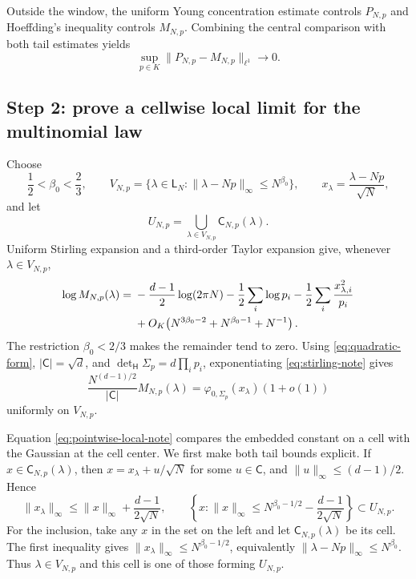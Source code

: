 \documentclass[11pt]{article}
\newcommand{\htile}{\mathsf H}
\begin{document}
Outside the window, the uniform Young concentration estimate controls
$P_{N,p}$ and Hoeffding's inequality controls $M_{N,p}$.  Combining the
central comparison with both tail estimates yields
\begin{equation}\label{eq:young-mult-l1-note}
  \sup_{p\in K}\|P_{N,p}-M_{N,p}\|_{\ell^1}\longrightarrow0.
\end{equation}

\subsection*{Step 2: prove a cellwise local limit for the multinomial law}

Choose
\[
  \frac12<\beta_0<\frac23,
  \qquad
  V_{N,p}=\{\lambda\in\mathsf L_N:
  \|\lambda-Np\|_\infty\le N^{\beta_0}\},
  \qquad
  x_\lambda=\frac{\lambda-Np}{\sqrt N},
\]
and let
\[
  U_{N,p}=\bigcup_{\lambda\in V_{N,p}}
  \mathsf C_{N,p}(\lambda).
\]
Uniform Stirling expansion and a third-order Taylor expansion give, whenever
$\lambda\in V_{N,p}$,
\begin{align}
  \log M_{N,p}(\lambda)
  ={}&-\frac{d-1}{2}\log(2\pi N)
      -\frac12\sum_i\log p_i
      -\frac12\sum_i\frac{x_{\lambda,i}^2}{p_i}\notag\\
     &+O_K\!\left(N^{3\beta_0-2}
                  +N^{\beta_0-1}+N^{-1}\right).
  \label{eq:stirling-note}
\end{align}
The restriction $\beta_0<2/3$ makes the remainder tend to zero.  Using
\eqref{eq:quadratic-form}, $|\mathsf C|=\sqrt d$, and
$\det_{\htile}\Sigma_p=d\prod_i p_i$, exponentiating
\eqref{eq:stirling-note} gives
\begin{equation}\label{eq:pointwise-local-note}
  \frac{N^{(d-1)/2}}{|\mathsf C|}M_{N,p}(\lambda)
  =\varphi_{0,\Sigma_p}(x_\lambda)(1+o(1))
\end{equation}
uniformly on $V_{N,p}$.

Equation \eqref{eq:pointwise-local-note} compares the embedded constant on a
cell with the Gaussian at the cell center.  We first make both tail bounds
explicit.  If $x\in\mathsf C_{N,p}(\lambda)$, then
$x=x_\lambda+u/\sqrt N$ for some $u\in\mathsf C$, and
$\|u\|_\infty\le(d-1)/2$.  Hence
\[
  \|x_\lambda\|_\infty
  \le\|x\|_\infty+\frac{d-1}{2\sqrt N},
  \qquad
  \left\{x:\|x\|_\infty\le
  N^{\beta_0-1/2}-\frac{d-1}{2\sqrt N}\right\}
  \subset U_{N,p}.
\]
For the inclusion, take any $x$ in the set on the left and let
$\mathsf C_{N,p}(\lambda)$ be its cell.  The first inequality gives
$\|x_\lambda\|_\infty\le N^{\beta_0-1/2}$, equivalently
$\|\lambda-Np\|_\infty\le N^{\beta_0}$.  Thus
$\lambda\in V_{N,p}$ and this cell is one of those forming $U_{N,p}$.
\end{document}
